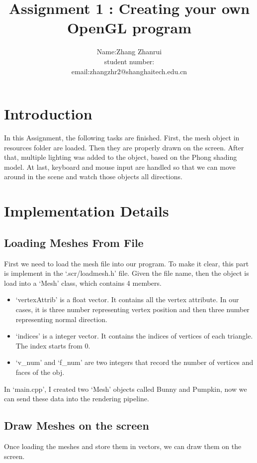 \documentclass[acmtog]{acmart}
\title{Assignment 1 : Creating your own OpenGL program}
\author{Name:\quad Zhang Zhanrui  \\ student number:\quad 2019533227
	\\email:\quad zhangzhr2@shanghaitech.edu.cn}
\begin{document}
\maketitle

\vspace*{2 ex}

\section{Introduction}

In this Assignment, the following tasks are finished. First, the mesh object in resources folder are loaded. Then they are properly drawn on the screen. After that, multiple lighting was added to the object, based on the Phong shading model. At last, keyboard and mouse input are handled so that we can move around in the scene and watch those objects all directions.

\section{Implementation Details}

\subsection{Loading Meshes From File}

First we need to load the mesh file into our program. To make it clear, this part is implement in the `.scr/loadmesh.h' file. Given the file name, then the object is load into a `Mesh' class, which contains 4 members. 
\begin{itemize}
	\item 
	`vertexAttrib' is a float vector. It contains all the vertex attribute. In our cases, it is three number representing vertex position and then three number representing normal direction.
	\item	
	`indices' is a integer vector. It contains the indices of vertices of each triangle. The index starts from 0.
	\item	
	`v\_num' and `f\_num' are two integers that record the number of vertices and faces of the obj.
\end{itemize}

In `main.cpp', I created two `Mesh' objects called Bunny and Pumpkin, now we can send these data into the rendering pipeline.

\subsection{Draw Meshes on the screen}
Once loading the meshes and store them in vectors, we can draw them on the screen.
\end{document}
